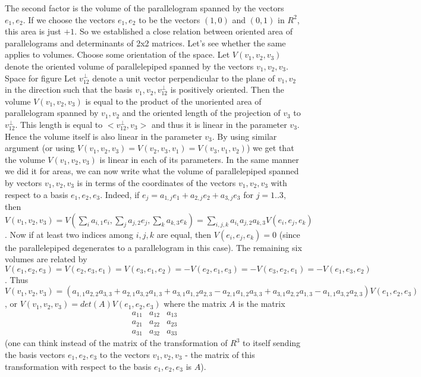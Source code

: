 The second factor is the volume of the parallelogram spanned by the vectors $e_1,e_2$. If we choose the vectors $e_1,e_2$ to be the vectors $(1,0)$ and $(0,1)$ in $R^2$, this area is just $+1$.
So we established a close relation between oriented area of parallelograms and determinants of 2x2 matrices.
Let's see whether the same applies to volumes. Choose some orientation of the space. Let $V(v_1,v_2,v_3)$ denote the oriented volume of parallelepiped spanned by the vectors $v_1,v_2,v_3$.
Space for figure
Let $v_{12}^\perp$ denote a unit vector perpendicular to the plane of $v_1,v_2$ in the direction such that the basis $v_1,v_2,v_{12}^\perp$ is positively oriented. Then the volume $V(v_1,v_2,v_3)$ is equal to the product of the unoriented area of parallelogram spanned by $v_1,v_2$ and the oriented length of the projection of $v_3$ to $v_{12}^\perp$. This length is equal to $<v_{12}^\perp,v_3>$ and thus it is linear in the parameter $v_3$. Hence the volume itself is also linear in the parameter $v_3$. By using similar argument (or using $V(v_1,v_2,v_3)=V(v_2,v_3,v_1)=V(v_3,v_1,v_2)$) we get that the volume $V(v_1,v_2,v_3)$ is linear in each of its parameters.
In the same manner we did it for areas, we can now write what the volume of parallelepiped spanned by vectors $v_1,v_2,v_3$ is in terms of the coordinates of the vectors $v_1,v_2,v_3$ with respect to a basis $e_1,e_2,e_3$. Indeed, if $e_j=a_{1,j}e_1+a_{2,j}e_2+a_{3,j}e_3$ for $j=1..3$, then $V(v_1,v_2,v_3)=V(\sum_{i}{a_{i,1}e_i},\sum_{j}{a_{j,2}e_j},\sum_{k}{a_{k,3}e_k})=\sum_{i,j,k}{a_{i_1}a_{j,2}a_{k,3}V(e_i,e_j,e_k)}$. Now if at least two indices among $i,j,k$ are equal, then $V(e_i,e_j,e_k)=0$ (since the parallelepiped degenerates to a parallelogram in this case). The remaining six volumes are related by $V(e_1,e_2,e_3)=V(e_2,e_3,e_1)=V(e_3,e_1,e_2)=-V(e_2,e_1,e_3)=-V(e_3,e_2,e_1)=-V(e_1,e_3,e_2)$. Thus $V(v_1,v_2,v_3)=(a_{1,1}a_{2,2}a_{3,3}+a_{2,1}a_{3,2}a_{1,3}+a_{3,1}a_{1,2}a_{2,3}-a_{2,1}a_{1,2}a_{3,3}+a_{3,1}a_{2,2}a_{1,3}-a_{1,1}a_{3,2}a_{2,3})V(e_1,e_2,e_3)$, or $V(v_1,v_2,v_3)=det(A)V(e_1,e_2,e_3)$ where the matrix $A$ is the matrix $$\begin{array}{ccc}a_{11} & a_{12} & a_{13} \\ a_{21} & a_{22} & a_{23} \\ a_{31} & a_{32} & a_{33}\end{array}$$ (one can think instead of the matrix of the transformation of $R^3$ to itself sending the basis vectors $e_1,e_2,e_3$ to the vectors $v_1,v_2,v_3$ - the matrix of this transformation with respect to the basis $e_1,e_2,e_3$ is $A$).
